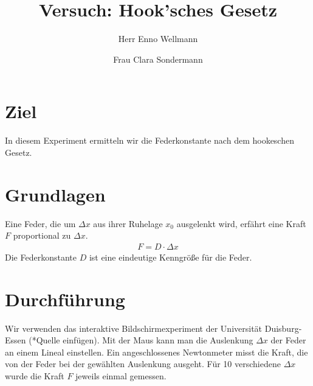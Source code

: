 

\author{Herr Enno Wellmann \and Frau Clara Sondermann} %
\title{Versuch: Hook'sches Gesetz}


\maketitle

\section[short]{Ziel}
In diesem Experiment ermitteln wir die Federkonstante nach dem hookeschen Gesetz.

\section{Grundlagen}
Eine Feder, die um $ \Delta x $ aus ihrer Ruhelage $ x_0 $ ausgelenkt wird, erfährt eine Kraft $ F $ 
proportional zu $ \Delta x $.
\begin{align}
    F = D \cdot \Delta x
\end{align}
Die Federkonstante $ D $ ist eine eindeutige Kenngröße für die Feder.

\section{Durchführung}
Wir verwenden das interaktive Bildschirmexperiment der Universität Duisburg-Essen (*Quelle einfügen).
Mit der Maus kann man die Auslenkung $ \Delta x $ der Feder an einem Lineal einstellen. 
Ein angeschlossenes Newtonmeter misst die Kraft, die von der Feder bei der gewählten Auslenkung ausgeht.
Für 10 verschiedene $ \Delta x $ wurde die Kraft $ F $ jeweils einmal gemessen.
